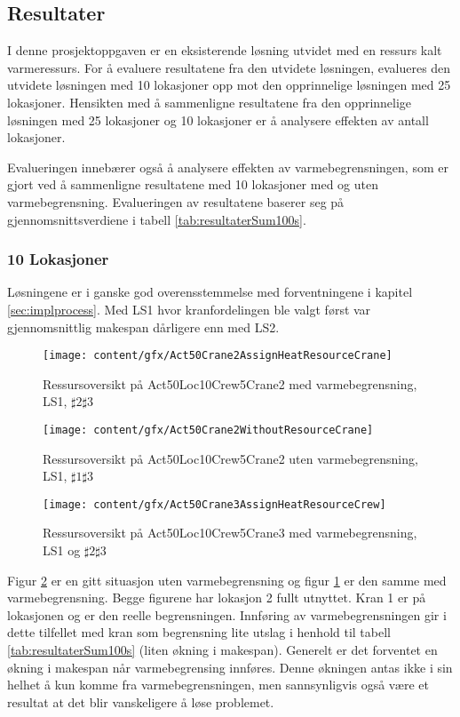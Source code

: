 \subsection{Resultater}
I denne prosjektoppgaven er en eksisterende løsning utvidet med en ressurs kalt varmeressurs. For å evaluere resultatene fra den utvidete løsningen, evalueres den utvidete løsningen med 10 lokasjoner opp mot den opprinnelige løsningen med 25 lokasjoner. Hensikten med å sammenligne resultatene fra den opprinnelige løsningen med 25 lokasjoner og 10 lokasjoner er å analysere effekten av antall lokasjoner.

Evalueringen innebærer også å analysere effekten av varmebegrensningen, som er gjort ved å sammenligne resultatene med 10 lokasjoner med og uten varmebegrensning. Evalueringen av resultatene baserer seg på gjennomsnittsverdiene i tabell \ref{tab:resultaterSum100s}.

\subsubsection{10 Lokasjoner}
Løsningene er i ganske god overensstemmelse med forventningene i kapitel \ref{sec:implprocess}. Med LS1 hvor kranfordelingen ble valgt først var gjennomsnittlig makespan dårligere enn med LS2.

\begin{figure}[!h]
\centering
\texttt{[image: content/gfx/Act50Crane2AssignHeatResourceCrane]}
\caption{Ressursoversikt på Act50Loc10Crew5Crane2 med varmebegrensning, LS1, $\sharp2\sharp3$}
\label{fig:RessursWithAct50Loc10Crew5Crane2LS1}
\end{figure}
\begin{figure}[!h]
\centering
\texttt{[image: content/gfx/Act50Crane2WithoutResourceCrane]}
\caption{Ressursoversikt på Act50Loc10Crew5Crane2 uten varmebegrensning, LS1, $\sharp1\sharp3$}
\label{fig:RessursWithoutAct50Loc10Crew5Crane2LS1}
\end{figure}
\begin{figure}[!h]
\centering
\texttt{[image: content/gfx/Act50Crane3AssignHeatResourceCrew]}
\caption{Ressursoversikt på Act50Loc10Crew5Crane3 med varmebegrensning, LS1 og $\sharp2\sharp3$}
\label{fig:RessursWithAct50Loc10Crew5Crane3LS1}
\end{figure}
Figur \ref{fig:RessursWithoutAct50Loc10Crew5Crane2LS1} er en gitt situasjon uten varmebegrensning og figur \ref{fig:RessursWithAct50Loc10Crew5Crane2LS1} er den samme med varmebegrensning. Begge figurene har lokasjon 2 fullt utnyttet. Kran 1 er på lokasjonen og er den reelle begrensningen. Innføring av varmebegrensningen gir i dette tilfellet med kran som begrensning lite utslag i henhold til tabell \ref{tab:resultaterSum100s} (liten økning i makespan). Generelt er det forventet en økning i makespan når varmebegrensing innføres. Denne økningen antas ikke i sin helhet å kun komme fra varmebegrensningen, men sannsynligvis også være et resultat at det blir vanskeligere å løse problemet.

